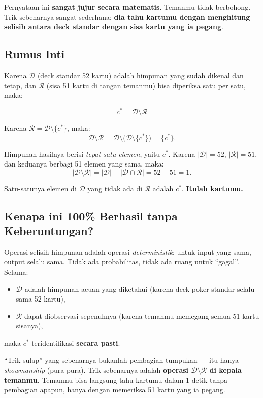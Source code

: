 \documentclass[11pt,a4paper]{article}
\theoremstyle{definition}
\begin{document}
Pernyataan ini \textbf{sangat jujur secara matematis}. Temanmu tidak berbohong. Trik sebenarnya sangat sederhana: \textbf{dia tahu kartumu dengan menghitung selisih antara deck standar dengan sisa kartu yang ia pegang}.

\subsection{Rumus Inti}

Karena $\mathcal{D}$ (deck standar 52 kartu) adalah himpunan yang sudah dikenal dan tetap, dan $\mathcal{R}$ (sisa 51 kartu di tangan temanmu) bisa diperiksa satu per satu, maka:

\begin{rumusbox}
\[
\boxed{\; c^* = \mathcal{D} \setminus \mathcal{R} \;}
\]
\end{rumusbox}

Karena $\mathcal{R} = \mathcal{D} \setminus \{c^*\}$, maka:
\[
\mathcal{D} \setminus \mathcal{R} = \mathcal{D} \setminus \bigl(\mathcal{D} \setminus \{c^*\}\bigr) = \{c^*\}.
\]

Himpunan hasilnya berisi \emph{tepat satu elemen}, yaitu $c^*$. Karena $|\mathcal{D}| = 52$, $|\mathcal{R}| = 51$, dan keduanya berbagi 51 elemen yang sama, maka:
\[
|\mathcal{D} \setminus \mathcal{R}| = |\mathcal{D}| - |\mathcal{D} \cap \mathcal{R}| = 52 - 51 = 1.
\]

Satu-satunya elemen di $\mathcal{D}$ yang tidak ada di $\mathcal{R}$ adalah $c^*$. \textbf{Itulah kartumu.}

\subsection{Kenapa ini 100\% Berhasil tanpa Keberuntungan?}

Operasi selisih himpunan adalah operasi \emph{deterministik}: untuk input yang sama, output selalu sama. Tidak ada probabilitas, tidak ada ruang untuk ``gagal''. Selama:
\begin{itemize}
    \item $\mathcal{D}$ adalah himpunan acuan yang diketahui (karena deck poker standar selalu sama 52 kartu),
    \item $\mathcal{R}$ dapat diobservasi sepenuhnya (karena temanmu memegang semua 51 kartu sisanya),
\end{itemize}
maka $c^*$ teridentifikasi \textbf{secara pasti}.

\begin{insightbox}
``Trik sulap'' yang sebenarnya bukanlah pembagian tumpukan --- itu hanya \emph{showmanship} (pura-pura). Trik sebenarnya adalah \textbf{operasi $\mathcal{D} \setminus \mathcal{R}$ di kepala temanmu}. Temanmu bisa langsung tahu kartumu dalam 1 detik tanpa pembagian apapun, hanya dengan memeriksa 51 kartu yang ia pegang.
\end{insightbox}
\end{document}
